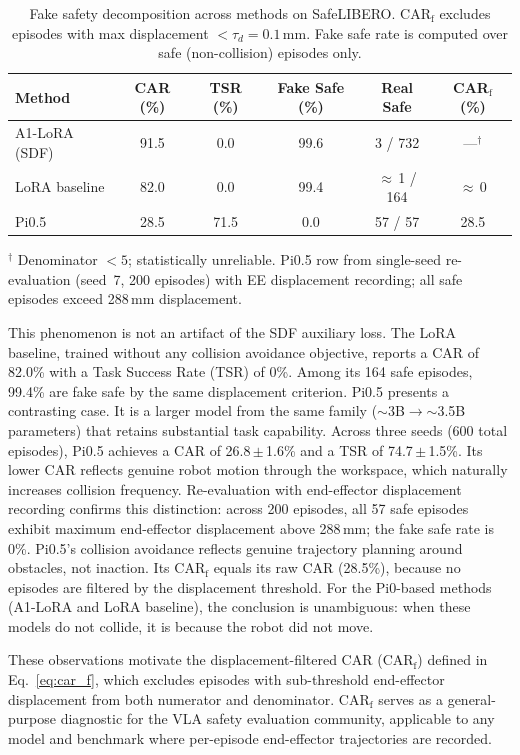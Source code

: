 \begin{table}[t]
\centering
\caption{Fake safety decomposition across methods on SafeLIBERO. CAR$_\text{f}$ excludes episodes with max displacement $< \tau_d = 0.1$\,mm. Fake safe rate is computed over safe (non-collision) episodes only.}
\label{tab:fake_safety}
\vspace{2pt}
\small
\begin{tabular}{lccccc}
\toprule
Method & CAR (\%) & TSR (\%) & Fake Safe (\%) & Real Safe & CAR$_\text{f}$ (\%) \\
\midrule
A1-LoRA (SDF) & 91.5 & 0.0 & 99.6 & 3 / 732 & ---$^\dagger$ \\
LoRA baseline  & 82.0 & 0.0 & 99.4 & $\approx$\,1 / 164 & $\approx$\,0 \\
Pi0.5 & 28.5 & 71.5 & 0.0 & 57 / 57 & 28.5 \\
\bottomrule
\end{tabular}
\vspace{2pt}
{\footnotesize $^\dagger$ Denominator $< 5$; statistically unreliable. Pi0.5 row from single-seed re-evaluation (seed~7, 200 episodes) with EE displacement recording; all safe episodes exceed 288\,mm displacement.}
\end{table}

This phenomenon is not an artifact of the SDF auxiliary loss. The LoRA baseline, trained without any collision avoidance objective, reports a CAR of 82.0\% with a Task Success Rate (TSR) of 0\%. Among its 164 safe episodes, 99.4\% are fake safe by the same displacement criterion. Pi0.5 presents a contrasting case. It is a larger model from the same family (${\sim}$3B$\to$${\sim}$3.5B parameters) that retains substantial task capability. Across three seeds (600 total episodes), Pi0.5 achieves a CAR of 26.8\,$\pm$\,1.6\% and a TSR of 74.7\,$\pm$\,1.5\%. Its lower CAR reflects genuine robot motion through the workspace, which naturally increases collision frequency. Re-evaluation with end-effector displacement recording confirms this distinction: across 200 episodes, all 57 safe episodes exhibit maximum end-effector displacement above 288\,mm; the fake safe rate is 0\%. Pi0.5's collision avoidance reflects genuine trajectory planning around obstacles, not inaction. Its CAR$_\text{f}$ equals its raw CAR (28.5\%), because no episodes are filtered by the displacement threshold.
For the Pi0-based methods (A1-LoRA and LoRA baseline), the conclusion is unambiguous: when these models do not collide, it is because the robot did not move.

These observations motivate the displacement-filtered CAR (CAR$_\text{f}$) defined in Eq.~\ref{eq:car_f}, which excludes episodes with sub-threshold end-effector displacement from both numerator and denominator. CAR$_\text{f}$ serves as a general-purpose diagnostic for the VLA safety evaluation community, applicable to any model and benchmark where per-episode end-effector trajectories are recorded.


